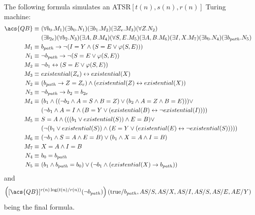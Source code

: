 The following formula simulates an \acs{ATSR}$[t(n), s(n), r(n)]$ Turing machine:
\[
    \begin{aligned}
        \acs{QB} \equiv&~(\forall b_{0}.M_{1})(\exists b_{0}.N_{1})(\exists b_{1}.M_{2})(\exists Z_{e}.M_{3})(\forall Z.N_{2})\\
        &~(\exists b_{2e})(\forall b_{2}.N_{3})(\exists A, B.M_{4})(\forall S, E.M_{5})(\exists A, B.M_{6})(\exists I, X.M_{7})(\exists b_{0}.N_{4})(\exists b_{path}.N_{5}) \\
        M_{1} \equiv&~b_{path} \to \neg(I = Y \land (S = E \lor \varphi(S, E))) \\
        N_{1} \equiv&~\neg b_{path} \to \neg(S = E \lor \varphi(S, E)) \\
        M_{2} \equiv&~\neg b_{1} \leftrightarrow (S = E \lor \varphi(S, E)) \\
        M_{3} \equiv&~existential(Z_{e}) \leftrightarrow existential(X)\\
        N_{2} \equiv&~(b_{path} \to Z = Z_{e}) \land (existential(Z) \leftrightarrow existential(X))\\
        N_{3} \equiv&~ \neg b_{path} \to b_{2} = b_{2e}\\
        M_{4} \equiv&~(b_{1} \land ((\neg b_{2} \land A = S  \land B = Z) \lor (b_{2} \land A = Z \land B = E))) \lor \\
        &~(\neg b_{1} \land  A = I \land (B = Y \lor (existential(B) \leftrightarrow \neg existential(I)))) \\
        M_{5} \equiv&~S = A \land ((( b_{1} \lor existential(S)) \land E = B) \lor \\
        &~(\neg( b_{1} \lor existential(S)) \land (E = Y \lor (existential(E)\leftrightarrow \neg existential(S))))) \\
        M_{6} \equiv&~(\neg b_{1}  \land S = A \land E = B) \lor (b_{1} \land X = A \land I = B)\\
        M_{7} \equiv&~X = A \land I = B \\
        N_{4} \equiv&~b_{0} = b_{path} \\
        N_{5} \equiv&~(b_{1} \land b_{path} = b_{0}) \lor (\neg b_{1} \land (existential(X) \to b_{path}))
    \end{aligned}
\]
and \[\left([\acs{QB}]^{r(n)\log(t(n)/r(n))}(\neg b_{path})\right)(\text{true} / b_{path}, AS / S, AS / X, AS /I, AS /S, AS / E, AE / Y)\] being the final formula.

